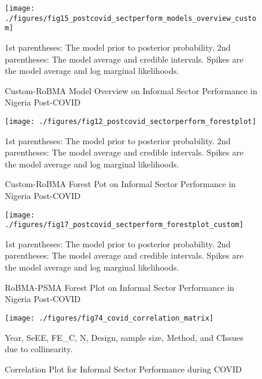 \documentclass[a4paper, 12pt]{article}
\begin{document}
    \begin{figure}[H]
        \centering
        \texttt{[image: ./figures/fig15\_postcovid\_sectperform\_models\_overview\_custom]}
        \caption{Custom-RoBMA Model Overview on Informal Sector Performance in Nigeria Post-COVID}
        \label{fig19:custom-robma-model-overview-postcovid}
        \begin{minipage}{10cm}
            \vspace{0.1cm}
            \small 1st parentheses: The model prior to posterior probability. 2nd parentheses: The model average and credible intervals. Spikes are the model average and log marginal likelihoods.
        \end{minipage}
    \end{figure}

    \begin{figure}[H]
        \centering
        \texttt{[image: ./figures/fig12\_postcovid\_sectorperform\_forestplot]}
        \caption{Custom-RoBMA Forest Pot on Informal Sector Performance in Nigeria Post-COVID}
        \label{fig20:robma-psma-forest-plot-postcovid}
        \begin{minipage}{10cm}
            \vspace{0.1cm}
            \small 1st parentheses: The model prior to posterior probability. 2nd parentheses: The model average and credible intervals. Spikes are the model average and log marginal likelihoods.
        \end{minipage}
    \end{figure}

    \begin{figure}[H]
        \centering
        \texttt{[image: ./figures/fig17\_postcovid\_sectperform\_forestplot\_custom]}
        \caption{RoBMA-PSMA Forest Plot on Informal Sector Performance in Nigeria Post-COVID}
        \label{fig21:custom-robma-forest-plot-covid}
        \begin{minipage}{10cm}
            \vspace{0.1cm}
            \small 1st parentheses: The model prior to posterior probability. 2nd parentheses: The model average and credible intervals. Spikes are the model average and log marginal likelihoods.
        \end{minipage}
    \end{figure}

    \begin{figure}[H]
        \centering
        \texttt{[image: ./figures/fig74\_covid\_correlation\_matrix]}
        \caption{Correlation Plot for Informal Sector Performance during COVID}
        \label{fig22:corrplot-inform-sector-covid}
        \begin{minipage}{10cm}
            \vspace{.1cm}
            \small Year, SeEE, FE\_C, N, Design, sample size, Method, and CIssues due to collinearity.
        \end{minipage}
    \end{figure}
\end{document}

